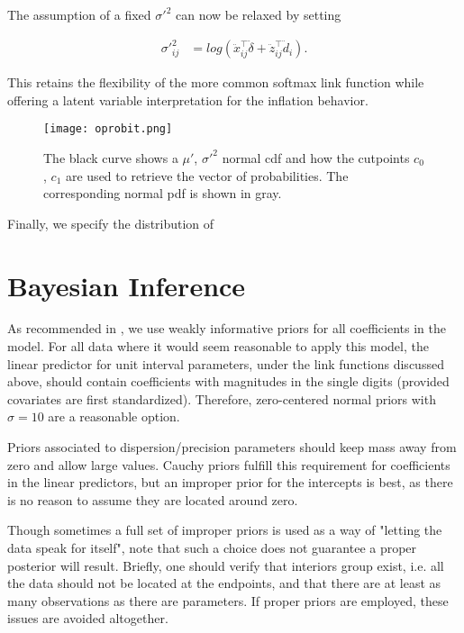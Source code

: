 The assumption of a fixed $\sigma'^{2}$ can now be relaxed by setting

\begin{equation}
\begin{split}
\sigma'^{2}_{ij} &= log(\ddot{x}_{ij}^{\top} \ddot{\delta}+\ddot{z}_{ij}^{\top} \ddot{d}_i).
\end{split}
\label{eq:oprobit2}
\end{equation}

This retains the flexibility of the more common softmax link function while offering a latent variable interpretation for the inflation behavior.

\begin{figure}
  \texttt{[image: oprobit.png]}
  \caption{The black curve shows a $\mu'$, $\sigma'^{2}$ normal cdf and how the cutpoints $c_0$, $c_1$ are used to retrieve the vector of probabilities. The corresponding normal pdf is shown in gray.}
  \label{fig:oprobit}
\end{figure}

Finally, we specify the distribution of 

\section{Bayesian Inference}



As recommended in \cite{Gelman2013}, we use weakly informative priors for all coefficients in the model. For all data where it would seem reasonable to apply this model, the linear predictor for unit interval parameters, under the link functions discussed above, should contain coefficients with magnitudes in the single digits (provided covariates are first standardized). Therefore, zero-centered normal priors with $\sigma=10$ are a reasonable option.

Priors associated to dispersion/precision parameters should keep mass away from zero and allow large values. Cauchy priors fulfill this requirement for coefficients in the linear predictors, but an improper prior for the intercepts is best, as there is no reason to assume they are located around zero.

Though sometimes a full set of improper priors is used as a way of "letting the data speak for itself",  note that such a choice does not guarantee a proper posterior will result. \cite{Tak2015} Briefly, one should verify that interiors group exist, i.e. all the data should not be located at the endpoints, and that there are at least as many observations as there are parameters. If proper priors are employed, these issues are avoided altogether.


